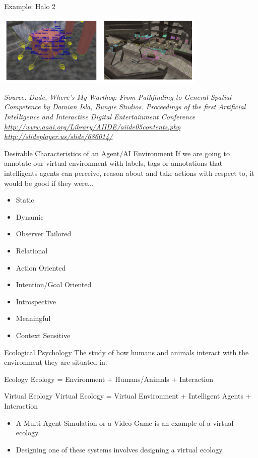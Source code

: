 \documentclass[xcolor=dvipsnames,t]{beamer}
\begin{document}
\begin{frame}{Example: Halo 2} 
\begin{center} 
\includegraphics[width=10cm]{halo} 
\end{center} 
\tiny
\emph{Source: Dude, Where's My Warthog: From Pathfinding to General Spatial
Competence by Damian Isla, Bungie Studios. Proceedings of the first Artificial
Intelligence and Interactive Digital Entertainment Conference \\[1cm] 
\url{http://www.aaai.org/Library/AIIDE/aiide05contents.php} \\
\url{http://slideplayer.us/slide/686014/ } }
\normalsize
\end{frame} 

\begin{frame}{Desirable Characteristics of an Agent/AI Environment} 
If we are going to annotate our virtual environment with labels, tags
or annotations that intelligents agents can perceive, reason about
and take actions with respect to, it would be good if they were...
\begin{itemize} 
    \item Static 
    \item Dynamic
    \item Observer Tailored
    \item Relational 
    \item Action Oriented
    \item Intention/Goal Oriented
    \item Introspective
    \item Meaningful
    \item Context Sensitive
\end{itemize} 
\end{frame} 

\begin{frame}{Ecological Psychology} 
The study of how humans and animals interact with the environment they are
situated in. 
\begin{block}{Ecology} 
Ecology = Environment + Humans/Animals + Interaction 
\end{block} 
\begin{block}{Virtual Ecology} 
Virtual Ecology = Virtual Environment + Intelligent Agents + Interaction 
\end{block} 
\pause
\begin{itemize} 
\item A Multi-Agent Simulation or a Video Game is an example of a virtual ecology. 
\item Designing one of these systems involves designing a virtual ecology. 
\end{itemize} 

\end{frame} 
\end{document}
